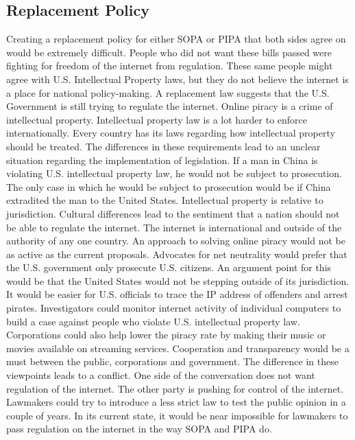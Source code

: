 \documentclass[11pt,journal,compsoc]{IEEEtran}
\begin{document}
\subsection{Replacement Policy}
Creating a replacement policy for either SOPA or PIPA that both sides agree on would be extremely difficult. People who did not want these bills passed were fighting for freedom of the internet from regulation. These same people might agree with U.S. Intellectual Property laws, but they do not believe the internet is a place for national policy-making. A replacement law suggests that the U.S. Government is still trying to regulate the internet. 
\indent Online piracy is a crime of intellectual property. Intellectual property law is a lot harder to enforce internationally. Every country has its laws regarding how intellectual property should be treated. The differences in these requirements lead to an unclear situation regarding the implementation of legislation. If a man in China is violating U.S. intellectual property law, he would not be subject to prosecution. The only case in which he would be subject to prosecution would be if China extradited the man to the United States. Intellectual property is relative to jurisdiction. Cultural differences lead to the sentiment that a nation should not be able to regulate the internet. The internet is international and outside of the authority of any one country. 
\indent An approach to solving online piracy would not be as active as the current proposals. Advocates for net neutrality would prefer that the U.S. government only prosecute U.S. citizens. An argument point for this would be that the United States would not be stepping outside of its jurisdiction. It would be easier for U.S. officials to trace the IP address of offenders and arrest pirates. Investigators could monitor internet activity of individual computers to build a case against people who violate U.S. intellectual property law. Corporations could also help lower the piracy rate by making their music or movies available on streaming services. Cooperation and transparency would be a must between the public, corporations and government.
\indent The difference in these viewpoints leads to a conflict. One side of the conversation does not want regulation of the internet. The other party is pushing for control of the internet. Lawmakers could try to introduce a less strict law to test the public opinion in a couple of years. In its current state, it would be near impossible for lawmakers to pass regulation on the internet in the way SOPA and PIPA do. 
\end{document}

